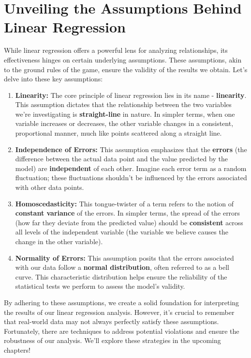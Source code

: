 \documentclass[
  letterpaper,
  paper =a4,
  twoside,
  openright,
  headsepline,
  footsepline,
  listof = totocnumbered,
  chapterprefix = true,
  firstiscover,
  parskip = full*]{scrbook}
\begin{document}
\section{Unveiling the Assumptions Behind Linear
Regression}\label{unveiling-the-assumptions-behind-linear-regression}

While linear regression offers a powerful lens for analyzing
relationships, its effectiveness hinges on certain underlying
assumptions. These assumptions, akin to the ground rules of the game,
ensure the validity of the results we obtain. Let's delve into these key
assumptions:

\begin{enumerate}
\def\labelenumi{\arabic{enumi}.}
\item
  \textbf{Linearity:} The core principle of linear regression lies in
  its name - \textbf{linearity}. This assumption dictates that the
  relationship between the two variables we're investigating is
  \textbf{straight-line} in nature. In simpler terms, when one variable
  increases or decreases, the other variable changes in a consistent,
  proportional manner, much like points scattered along a straight line.
\item
  \textbf{Independence of Errors:} This assumption emphasizes that the
  \textbf{errors} (the difference between the actual data point and the
  value predicted by the model) are \textbf{independent} of each other.
  Imagine each error term as a random fluctuation; these fluctuations
  shouldn't be influenced by the errors associated with other data
  points.
\item
  \textbf{Homoscedasticity:} This tongue-twister of a term refers to the
  notion of \textbf{constant variance} of the errors. In simpler terms,
  the spread of the errors (how far they deviate from the predicted
  value) should be \textbf{consistent} across all levels of the
  independent variable (the variable we believe causes the change in the
  other variable).
\item
  \textbf{Normality of Errors:} This assumption posits that the errors
  associated with our data follow a \textbf{normal distribution}, often
  referred to as a bell curve. This characteristic distribution helps
  ensure the reliability of the statistical tests we perform to assess
  the model's validity.
\end{enumerate}

By adhering to these assumptions, we create a solid foundation for
interpreting the results of our linear regression analysis. However,
it's crucial to remember that real-world data may not always perfectly
satisfy these assumptions. Fortunately, there are techniques to address
potential violations and ensure the robustness of our analysis. We'll
explore these strategies in the upcoming chapters!
\end{document}
